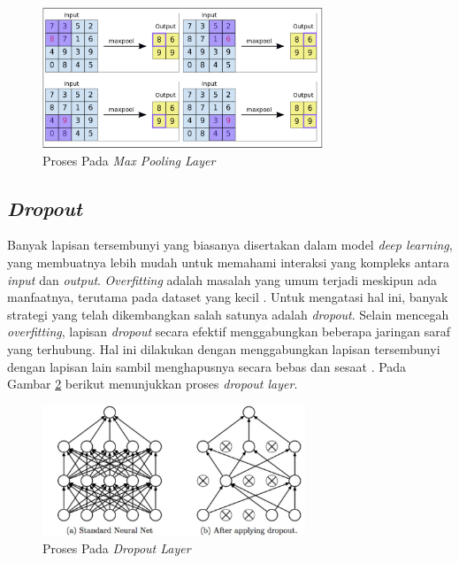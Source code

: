    \begin{figure}[H]
      \centering
      \includegraphics[width=0.75\textwidth]{figures/bab2/pool.png}
      \caption{Proses Pada \textit{Max Pooling Layer} \cite{fiki}}
      \label{Proses Pada Max Pooling Layer}

    
    \end{figure}

\subsection{\textit{Dropout}}

    Banyak lapisan tersembunyi yang biasanya disertakan dalam model \textit{deep learning}, yang membuatnya lebih mudah untuk memahami interaksi yang kompleks antara \textit{input} dan \textit{output}. \textit{Overfitting} adalah masalah yang umum terjadi meskipun ada manfaatnya, terutama pada dataset yang kecil \cite{Srivastava2014}. Untuk mengatasi hal ini, banyak strategi yang telah dikembangkan salah satunya adalah \textit{dropout}. Selain mencegah \textit{overfitting}, lapisan \textit{dropout} secara efektif menggabungkan beberapa jaringan saraf yang terhubung. Hal ini dilakukan dengan menggabungkan lapisan tersembunyi dengan lapisan lain sambil menghapusnya secara bebas dan sesaat \cite{Srivastava2014}. Pada Gambar \ref{Proses Pada Dropout Layer} berikut menunjukkan proses \textit{dropout layer}.

    \begin{figure}[H]
      \centering
      \includegraphics[width=0.70\textwidth]{figures/bab2/drop out.jpg}
      \caption{Proses Pada \textit{Dropout Layer} \cite{ida}}
      \label{Proses Pada Dropout Layer}
    
    \end{figure} 

